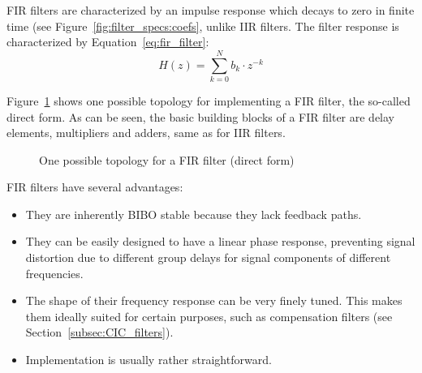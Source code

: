 FIR filters are  characterized by an impulse response which  decays to zero in
finite time (see  Figure~\ref{fig:filter_specs:coefs}, unlike IIR filters. The
filter response is characterized by Equation~\ref{eq:fir_filter}:
\begin{equation}
    \label{eq:fir_filter}
    H(z) = \sum_{k=0}^{N} b_k \cdot z^{-k}
\end{equation}

Figure~\ref{fig:filtertopologies:fir}   shows   one  possible   topology   for
implementing a  FIR filter,  the so-called  direct form. As  can be  seen, the
basic building  blocks of  a FIR  filter are  delay elements,  multipliers and
adders, same as for IIR filters.

\begin{figure}[b]
    \centering
    
    \caption[FIR Filter Topology Example]
        {One possible topology for a FIR filter (direct form)}
    \label{fig:filtertopologies:fir}
\end{figure}

FIR filters have several advantages:
\begin{itemize}\tightlist
    \item
        They are inherently BIBO stable because they lack feedback paths.
    \item
        They  can  be  easily  designed  to  have  a  linear  phase  response,
        preventing signal distortion due to  different group delays for signal
        components of different frequencies.
    \item
        The shape of  their frequency response can be  very finely tuned. This
        makes them ideally  suited for certain purposes,  such as compensation
        filters (see Section~\ref{subsec:CIC_filters}).
    \item
        Implementation is usually rather straightforward.
\end{itemize}

